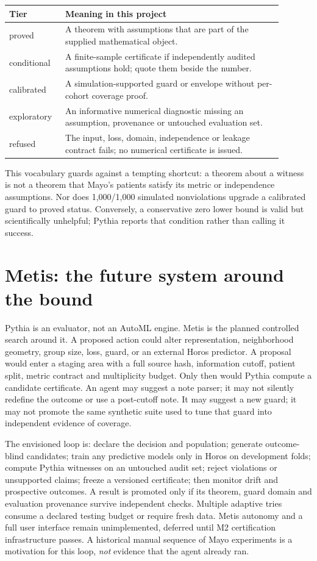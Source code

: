 \documentclass[11pt,a4paper]{article}
\newcommand{\claim}[1]{\textsf{#1}}
\begin{document}
\begin{center}
\begin{tabular}{p{0.17\linewidth}p{0.72\linewidth}}
\toprule
Tier & Meaning in this project\\
\midrule
\claim{proved} & A theorem with assumptions that are part of the supplied mathematical object.\\
\claim{conditional} & A finite-sample certificate if independently audited assumptions hold; quote them beside the number.\\
\claim{calibrated} & A simulation-supported guard or envelope without per-cohort coverage proof.\\
\claim{exploratory} & An informative numerical diagnostic missing an assumption, provenance or untouched evaluation set.\\
\claim{refused} & The input, loss, domain, independence or leakage contract fails; no numerical certificate is issued.\\
\bottomrule
\end{tabular}
\end{center}

This vocabulary guards against a tempting shortcut: a theorem about a witness is not a theorem that Mayo's patients satisfy its metric or independence assumptions. Nor does 1,000/1,000 simulated nonviolations upgrade a calibrated guard to proved status. Conversely, a conservative zero lower bound is valid but scientifically unhelpful; Pythia reports that condition rather than calling it success.

\section{Metis: the future system around the bound}

Pythia is an evaluator, not an AutoML engine. Metis is the planned controlled search around it. A proposed action could alter representation, neighborhood geometry, group size, loss, guard, or an external Horos predictor. A proposal would enter a staging area with a full source hash, information cutoff, patient split, metric contract and multiplicity budget. Only then would Pythia compute a candidate certificate. An agent may suggest a note parser; it may not silently redefine the outcome or use a post-cutoff note. It may suggest a new guard; it may not promote the same synthetic suite used to tune that guard into independent evidence of coverage.

The envisioned loop is: declare the decision and population; generate outcome-blind candidates; train any predictive models only in Horos on development folds; compute Pythia witnesses on an untouched audit set; reject violations or unsupported claims; freeze a versioned certificate; then monitor drift and prospective outcomes. A result is promoted only if its theorem, guard domain and evaluation provenance survive independent checks. Multiple adaptive tries consume a declared testing budget or require fresh data. Metis autonomy and a full user interface remain unimplemented, deferred until M2 certification infrastructure passes. A historical manual sequence of Mayo experiments is a motivation for this loop, \emph{not} evidence that the agent already ran.
\end{document}
